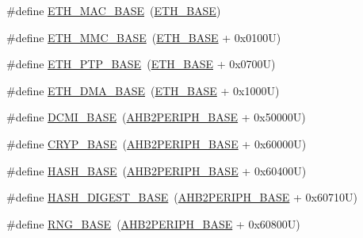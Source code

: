 \begin{DoxyCompactItemize}
\item 
\#define \hyperlink{group___peripheral__registers__structures_ga3cf7005808feb61bff1fee01e50a711a}{E\+T\+H\+\_\+\+M\+A\+C\+\_\+\+B\+A\+SE}~(\hyperlink{group___peripheral__memory__map_gad965a7b1106ece575ed3da10c45c65cc}{E\+T\+H\+\_\+\+B\+A\+SE})
\item 
\#define \hyperlink{group___peripheral__registers__structures_ga4946f2b3b03f7998343ac1778fbcf725}{E\+T\+H\+\_\+\+M\+M\+C\+\_\+\+B\+A\+SE}~(\hyperlink{group___peripheral__memory__map_gad965a7b1106ece575ed3da10c45c65cc}{E\+T\+H\+\_\+\+B\+A\+SE} + 0x0100\+U)
\item 
\#define \hyperlink{group___peripheral__registers__structures_gaa0f60b922aeb7275c785cbaa8f94ecf0}{E\+T\+H\+\_\+\+P\+T\+P\+\_\+\+B\+A\+SE}~(\hyperlink{group___peripheral__memory__map_gad965a7b1106ece575ed3da10c45c65cc}{E\+T\+H\+\_\+\+B\+A\+SE} + 0x0700\+U)
\item 
\#define \hyperlink{group___peripheral__registers__structures_gace2114e1b37c1ba88d60f3e831b67e93}{E\+T\+H\+\_\+\+D\+M\+A\+\_\+\+B\+A\+SE}~(\hyperlink{group___peripheral__memory__map_gad965a7b1106ece575ed3da10c45c65cc}{E\+T\+H\+\_\+\+B\+A\+SE} + 0x1000\+U)
\item 
\#define \hyperlink{group___peripheral__registers__structures_ga55b794507e021135486de57129a2505c}{D\+C\+M\+I\+\_\+\+B\+A\+SE}~(\hyperlink{group___peripheral__memory__map_gaeedaa71d22a1948492365e2cd26cfd46}{A\+H\+B2\+P\+E\+R\+I\+P\+H\+\_\+\+B\+A\+SE} + 0x50000\+U)
\item 
\#define \hyperlink{group___peripheral__registers__structures_ga019f3ad3b3212e56b45984efd8b8efef}{C\+R\+Y\+P\+\_\+\+B\+A\+SE}~(\hyperlink{group___peripheral__memory__map_gaeedaa71d22a1948492365e2cd26cfd46}{A\+H\+B2\+P\+E\+R\+I\+P\+H\+\_\+\+B\+A\+SE} + 0x60000\+U)
\item 
\#define \hyperlink{group___peripheral__registers__structures_ga398d121ca28c3f0f90a140b62184e242}{H\+A\+S\+H\+\_\+\+B\+A\+SE}~(\hyperlink{group___peripheral__memory__map_gaeedaa71d22a1948492365e2cd26cfd46}{A\+H\+B2\+P\+E\+R\+I\+P\+H\+\_\+\+B\+A\+SE} + 0x60400\+U)
\item 
\#define \hyperlink{group___peripheral__registers__structures_ga41efdf0e6db11dad3003d01882ee8bcb}{H\+A\+S\+H\+\_\+\+D\+I\+G\+E\+S\+T\+\_\+\+B\+A\+SE}~(\hyperlink{group___peripheral__memory__map_gaeedaa71d22a1948492365e2cd26cfd46}{A\+H\+B2\+P\+E\+R\+I\+P\+H\+\_\+\+B\+A\+SE} + 0x60710\+U)
\item 
\#define \hyperlink{group___peripheral__registers__structures_gab92662976cfe62457141e5b4f83d541c}{R\+N\+G\+\_\+\+B\+A\+SE}~(\hyperlink{group___peripheral__memory__map_gaeedaa71d22a1948492365e2cd26cfd46}{A\+H\+B2\+P\+E\+R\+I\+P\+H\+\_\+\+B\+A\+SE} + 0x60800\+U)

\end{DoxyCompactItemize}
